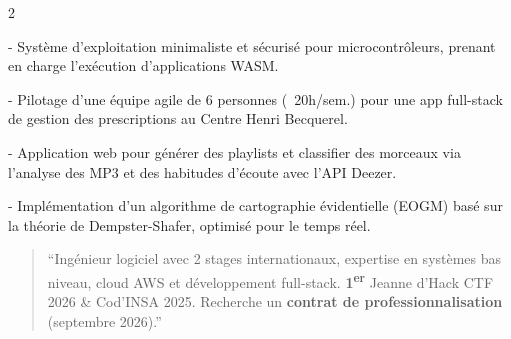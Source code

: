 \documentclass[10pt,a4paper,ragged2e,withhyper]{../AltaCV/altacv}
\begin{document}
\begin{paracol}{2}
  \divider

  \vspace{-0.5em}


  \begin{minipage}[t]{0.49\linewidth}
    {\small {} - Système d'exploitation minimaliste et sécurisé pour microcontrôleurs, prenant en charge l’exécution d’applications WASM.}

    \divider

    {\small {} - Pilotage d'une équipe agile de 6 personnes (~20h/sem.) pour une app full-stack de gestion des prescriptions au Centre Henri Becquerel.}
  \end{minipage}
  \hfill
  \begin{minipage}[t]{0.49\linewidth}
    {\small {} - Application web pour générer des playlists et classifier des morceaux via l’analyse des MP3 et des habitudes d’écoute avec l’API Deezer.}

    \divider

    {\small {} - Implémentation d’un algorithme de cartographie évidentielle (EOGM) basé sur la théorie de Dempster-Shafer, optimisé pour le temps réel.}
  \end{minipage}

  \medskip

  \switchcolumn


  \begin{quote}
    ``Ingénieur logiciel avec 2 stages internationaux, expertise en systèmes bas niveau, cloud AWS et développement full-stack. \textbf{1\textsuperscript{er}} Jeanne d'Hack CTF 2026 \& Cod'INSA 2025. Recherche un \textbf{contrat de professionnalisation} (septembre 2026).''
  \end{quote}


\end{paracol}
\end{document}
